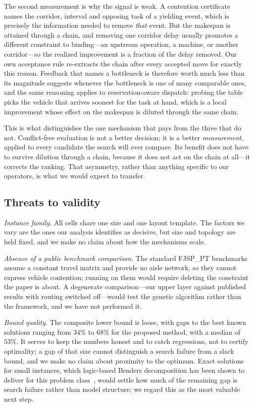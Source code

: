\documentclass[manuscript,screen,review]{acmart}
\begin{document}
The second measurement is why the signal is weak. A contention certificate
names the corridor, interval and opposing task of a yielding event, which is
precisely the information needed to remove \emph{that} event. But the makespan is
attained through a chain, and removing one corridor delay usually promotes a
different constraint to binding---an upstream operation, a machine, or another
corridor---so the realized improvement is a fraction of the delay removed. Our
own acceptance rule re-extracts the chain after every accepted move for exactly
this reason. Feedback that names a bottleneck is therefore worth much less than
its magnitude suggests whenever the bottleneck is one of many comparable ones,
and the same reasoning applies to reservation-aware dispatch: probing the table
picks the vehicle that arrives soonest for the task at hand, which is a local
improvement whose effect on the makespan is diluted through the same chain.

This is what distinguishes the one mechanism that pays from the three that do
not. Conflict-free evaluation is not a better decision; it is a better
\emph{measurement}, applied to every candidate the search will ever compare. Its
benefit does not have to survive dilution through a chain, because it does not
act on the chain at all---it corrects the ranking. That asymmetry, rather than
anything specific to our operators, is what we would expect to transfer.

\subsection{Threats to validity}
\label{sec:threats}

\emph{Instance family.} All cells share one size and one layout template. The
factors we vary are the ones our analysis identifies as decisive, but size and
topology are held fixed, and we make no claim about how the mechanisms scale.

\emph{Absence of a public benchmark comparison.} The standard FJSP\_PT
benchmarks assume a constant travel matrix and provide no aisle network, so
they cannot express vehicle contention; running on them would require deleting
the constraint the paper is about. A degenerate comparison---our upper layer
against published results with routing switched off---would test the genetic
algorithm rather than the framework, and we have not performed it.

\emph{Bound quality.} The composite lower bound is loose, with gaps to the best
known solutions ranging from $34\%$ to $68\%$ for the proposed method, with a
median of $53\%$. It serves to keep the numbers honest and to catch regressions,
not to certify optimality; a gap of that size cannot distinguish a search failure
from a slack bound, and we make no claim about proximity to the optimum. Exact solutions for
small instances, which logic-based Benders decomposition has been shown to
deliver for this problem class~\cite{vanos2026exact}, would settle how much of
the remaining gap is search failure rather than model structure; we regard this
as the most valuable next step.
\end{document}
